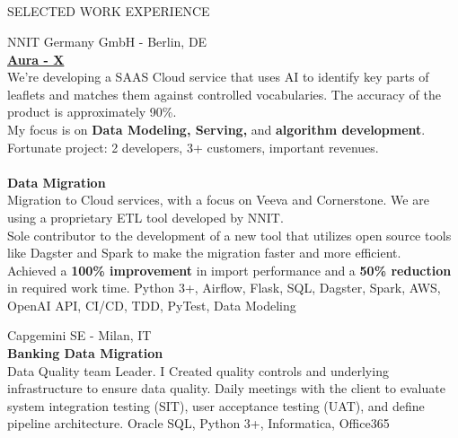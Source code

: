 \documentclass{my_cv}
\begin{document}
\begin{multicols}{2}
\section{\faPencil}{SELECTED WORK EXPERIENCE}
    
%
    {NNIT Germany GmbH - Berlin, DE}
    {\\\textbf{\href{https://www.nnit.com/our-solutions/regulatory-affairs/aura-x/}{Aura - X}}\\
    We're developing a SAAS Cloud service that uses AI to identify key parts of leaflets and matches them against controlled vocabularies. The accuracy of the product is approximately 90\%.\\My focus is on   \textbf{Data Modeling, Serving,} and \textbf{algorithm development}.\\Fortunate project: 2 developers, 3+ customers, important revenues.\\\\
    \textbf{Data Migration}\\
    Migration to Cloud services, with a focus on Veeva and Cornerstone. We are using a proprietary ETL tool developed by NNIT.\\Sole contributor to the development of a new tool that utilizes open source tools like Dagster and Spark to make the migration faster and more efficient.\\Achieved a \textbf{100\% improvement} in import performance and a \textbf{50\% reduction} in required work time.}
    {Python 3+, Airflow, Flask, SQL, Dagster, Spark, AWS, OpenAI API, CI/CD, TDD, PyTest, Data Modeling  }

%
    {Capgemini SE - Milan, IT}%
    {\\ \textbf{Banking Data Migration}\\
    Data Quality team Leader. I Created quality controls and underlying infrastructure to ensure data quality. Daily meetings with the client to evaluate system integration testing (SIT), user acceptance testing (UAT), and define pipeline architecture.}%
    {Oracle SQL, Python 3+, Informatica, Office365}

\columnbreak


\end{multicols}
\end{document}
